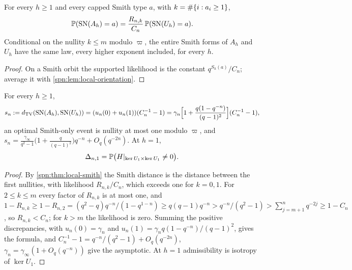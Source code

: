 \begin{theorem}\label{spn:thm:local-smith}
For every $h\ge1$ and every capped Smith type $a$, with $k=\#\{i:a_i\ge1\}$,
\[
 \mathbb{P}(\mathrm{SN}(A_h)=a)=\frac{R_{n,k}}{C_n}\,\mathbb{P}(\mathrm{SN}(U_h)=a).
\]
Conditional on the nullity $k\le m$ modulo $\varpi$, the entire Smith forms of $A_h$ and $U_h$ have
the same law, every higher exponent included, for every $h$.
\end{theorem}
\begin{proof}
On a Smith orbit the supported likelihood is the constant $q^{S_h(a)}/C_n$; average it with
\cref{spn:lem:local-orientation}.
\end{proof}

\begin{corollary}\label{spn:cor:local-smith-tv}
For every $h\ge1$,
\[
 s_n:=d_{\mathrm{TV}}(\mathrm{SN}(A_h),\mathrm{SN}(U_h))=(u_n(0)+u_n(1))(C_n^{-1}-1)
 =\gamma_n\Bigl[1+\frac{q(1-q^{-n})}{(q-1)^2}\Bigr](C_n^{-1}-1),
\]
an optimal Smith-only event is nullity at most one modulo $\varpi$, and
$s_n=\frac{\gamma_\infty}{q^2-1}\bigl(1+\frac q{(q-1)^2}\bigr)q^{-n}+O_q(q^{-2n})$. At $h=1$,
\begin{equation}\label{spn:eq:local-field}
 \Delta_{n,1}=\mathbb{P}\bigl(H|_{\ker U_1\times\ker U_1}\ne0\bigr).
\end{equation}
\end{corollary}
\begin{proof}
By \cref{spn:thm:local-smith} the Smith distance is the distance between the first nullities, with
likelihood $R_{n,k}/C_n$, which exceeds one for $k=0,1$. For $2\le k\le m$ every factor of $R_{n,k}$ is
at most one, and
$1-R_{n,k}\ge1-R_{n,2}=(q^2-q)q^{-n}/(1-q^{1-n})\ge q(q-1)q^{-n}>q^{-n}/(q^2-1)>\sum_{j=m+1}^nq^{-2j}\ge1-C_n$,
so $R_{n,k}<C_n$; for $k>m$ the likelihood is zero. Summing the positive discrepancies, with
$u_n(0)=\gamma_n$ and $u_n(1)=\gamma_nq(1-q^{-n})/(q-1)^2$, gives the formula, and
$C_n^{-1}-1=q^{-n}/(q^2-1)+O_q(q^{-2n})$, $\gamma_n=\gamma_\infty(1+O_q(q^{-n}))$ give the asymptotic. At $h=1$
admissibility is isotropy of $\ker U_1$.
\end{proof}

